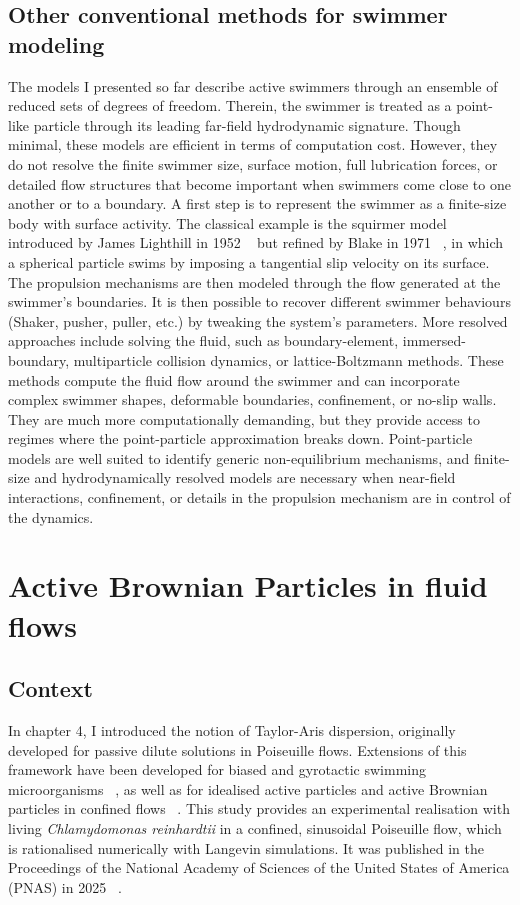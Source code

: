 \subsection{Other conventional methods for swimmer modeling}
The models I presented so far describe active swimmers through an ensemble of reduced sets of degrees of freedom. Therein, the swimmer is treated as a point-like particle through its leading far-field hydrodynamic signature. Though minimal, these models are efficient in terms of computation cost. However, they do not resolve the finite swimmer size, surface motion, full lubrication forces, or detailed flow structures that become important when swimmers come close to one another or to a boundary. A first step is to represent the swimmer as a finite-size body with surface activity. The classical example is the squirmer model introduced by James Lighthill in 1952 ~\cite{lighthill1952squirming} but refined by Blake in 1971 ~\cite{Blake_1971}, in which a spherical particle swims by imposing a tangential slip velocity on its surface. The propulsion mechanisms are then modeled through the flow generated at the swimmer's boundaries. It is then possible to recover different swimmer behaviours (Shaker, pusher, puller, etc.) by tweaking the system's parameters. More resolved approaches include solving the fluid, such as boundary-element, immersed-boundary, multiparticle collision dynamics, or lattice-Boltzmann methods. These methods compute the fluid flow around the swimmer and can incorporate complex swimmer shapes, deformable boundaries, confinement, or no-slip walls. They are much more computationally demanding, but they provide access to regimes where the point-particle approximation breaks down. Point-particle models are well suited to identify generic non-equilibrium mechanisms, and finite-size and hydrodynamically resolved models are necessary when near-field interactions, confinement, or details in the propulsion mechanism are in control of the dynamics.

\section{Active Brownian Particles in fluid flows}
\subsection{Context}
In chapter 4, I introduced the notion of Taylor-Aris dispersion, originally developed for passive dilute solutions in Poiseuille flows. Extensions of this framework have been developed for biased and gyrotactic swimming microorganisms ~\cite{hill2002taylor,manela2003generalized,bees2010dispersion,bearon2012biased}, as well as for idealised active particles and active Brownian particles in confined flows ~\cite{jiang2019dispersion,peng2020upstream}. This study provides an experimental realisation with living \textit{Chlamydomonas reinhardtii} in a confined, sinusoidal Poiseuille flow, which is rationalised numerically with Langevin simulations. It was published in the Proceedings of the National Academy of Sciences of the United States of America (PNAS) in 2025 ~\cite{lagoin_enhanced_2025}.



